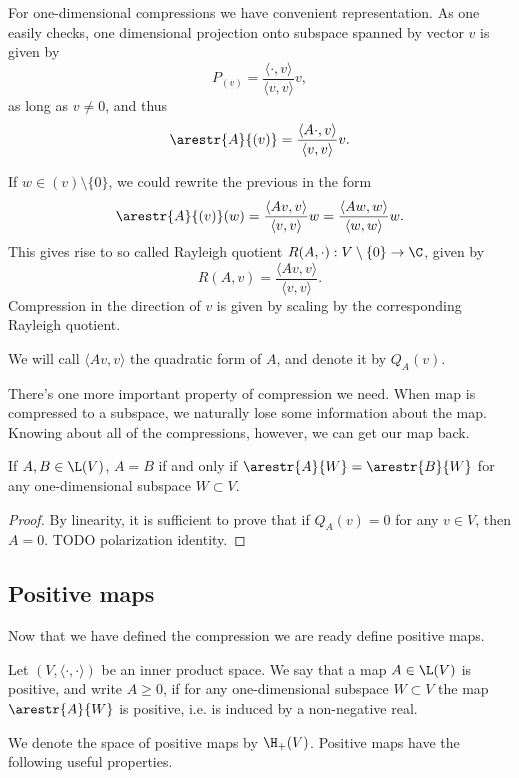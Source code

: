 For one-dimensional compressions we have convenient representation. As one easily checks, one dimensional projection onto subspace spanned by vector $v$ is given by
\[
	P_{(v)} = \frac{\langle \cdot, v \rangle}{\langle v, v \rangle} v,
\]
as long as $v \neq 0$, and thus
\[
	\arestr{A}{(v)} = \frac{\langle A \cdot, v \rangle}{\langle v, v \rangle} v.
\]

If $w \in (v) \setminus \{0\}$, we could rewrite the previous in the form
\[
	\arestr{A}{(v)}(w) = \frac{\langle A v, v\rangle}{\langle v, v\rangle} w = \frac{\langle A w, w\rangle}{\langle w, w \rangle} w.
\]
This gives rise to so called Rayleigh quotient $R(A, \cdot) : V \setminus \{0\} \to \C$, given by
\[
	R(A, v) = \frac{\langle A v, v \rangle}{\langle v, v \rangle}.
\]
Compression in the direction of $v$ is given by scaling by the corresponding Rayleigh quotient.

We will call $\langle A v, v \rangle$ the quadratic form of $A$, and denote it by $Q_{A}(v)$.

There's one more important property of compression we need. When map is compressed to a subspace, we naturally lose some information about the map. Knowing about all of the compressions, however, we can get our map back.

\begin{lem}
	If $A, B \in \L(V)$, $A = B$ if and only if $\arestr{A}{W} = \arestr{B}{W}$ for any one-dimensional subspace $W \subset V$.
\end{lem} 
\begin{proof}
	By linearity, it is sufficient to prove that if $Q_{A}(v) = 0$ for any $v \in V$, then $A = 0$. TODO polarization identity.
\end{proof}

\subsection{Positive maps}

Now that we have defined the compression we are ready define positive maps.

\begin{maar}
	Let $(V, \langle \cdot, \cdot \rangle)$ be an inner product space. We say that a map $A \in \L(V)$ is positive, and write $A \geq 0$, if for any one-dimensional subspace $W \subset V$ the map $\arestr{A}{W}$ is positive, i.e. is induced by a non-negative real.
\end{maar}

We denote the space of positive maps by $\H_{+}(V)$. Positive maps have the following useful properties.

